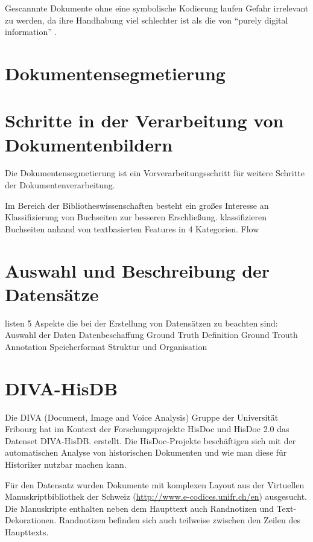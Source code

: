 Gescannnte Dokumente ohne eine symbolische Kodierung laufen Gefahr irrelevant zu werden,
da ihre Handhabung viel schlechter ist als die von ``purely digital information'' \parencite[10]{BairdDigitallibrariesdocument2003}.
 


\section{Dokumentensegmetierung}



\section{Schritte in der Verarbeitung von Dokumentenbildern}
Die Dokumentensegmetierung ist ein Vorverarbeitungsschritt für weitere Schritte der Dokumentenverarbeitung.

Im Bereich der Bibliotheswissenschaften besteht ein großes Interesse an Klassifizierung von
Buchseiten zur besseren Erschließung.
\cite{McConnaugheyLabeledSegmentationPrinted2017} klassifizieren Buchseiten anhand von textbasierten Features in 4 Kategorien. 
Flow

\section{Auswahl und Beschreibung der Datensätze}
\textcite[985\psqq]{DoermannHandbookdocumentimage2014} listen 5 Aspekte die bei der Erstellung von Datensätzen zu beachten sind:
Auswahl der Daten
Datenbeschaffung
Ground Truth Definition
Ground Trouth Annotation
Speicherformat
Struktur und Organisation

\section{DIVA-HisDB}
Die DIVA (Document, Image and Voice Analysis) Gruppe der Universität Fribourg hat im Kontext der Forschungsprojekte HisDoc und HisDoc 2.0 
das Datenset DIVA-HisDB. erstellt.
Die HisDoc-Projekte beschäftigen sich mit der automatischen Analyse von historischen Dokumenten und
wie man diese für Historiker nutzbar machen kann.

Für den Datensatz wurden Dokumente mit komplexen Layout aus der Virtuellen Manuskriptbibliothek der Schweiz (\url{http://www.e-codices.unifr.ch/en}) ausgesucht. Die Manuskripte enthalten neben dem Haupttext auch Randnotizen und Text-Dekorationen. Randnotizen befinden sich auch teilweise zwischen den Zeilen des Haupttexts.
 
